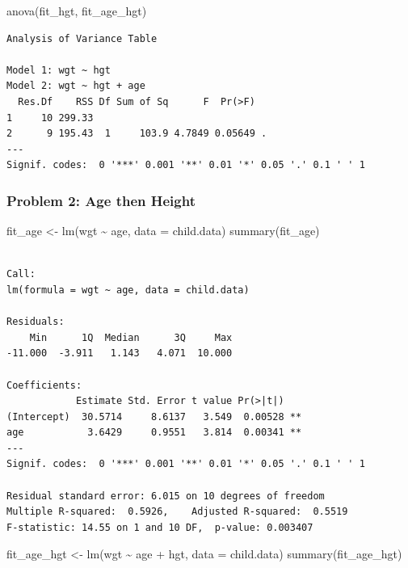 \documentclass[
  letterpaper,
]{scrbook}
\newenvironment{Shaded}{\begin{snugshade}}{\end{snugshade}}
\newcommand{\AttributeTok}[1]{\textcolor[rgb]{0.40,0.45,0.13}{#1}}
\newcommand{\FunctionTok}[1]{\textcolor[rgb]{0.28,0.35,0.67}{#1}}
\newcommand{\NormalTok}[1]{\textcolor[rgb]{0.00,0.23,0.31}{#1}}
\newcommand{\OtherTok}[1]{\textcolor[rgb]{0.00,0.23,0.31}{#1}}
\newcommand{\SpecialCharTok}[1]{\textcolor[rgb]{0.37,0.37,0.37}{#1}}
\begin{document}
\begin{Shaded}
\begin{Highlighting}[]
\FunctionTok{anova}\NormalTok{(fit\_hgt, fit\_age\_hgt)}
\end{Highlighting}
\end{Shaded}

\begin{verbatim}
Analysis of Variance Table

Model 1: wgt ~ hgt
Model 2: wgt ~ hgt + age
  Res.Df    RSS Df Sum of Sq      F  Pr(>F)  
1     10 299.33                              
2      9 195.43  1     103.9 4.7849 0.05649 .
---
Signif. codes:  0 '***' 0.001 '**' 0.01 '*' 0.05 '.' 0.1 ' ' 1
\end{verbatim}

\subsubsection{Problem 2: Age then
Height}\label{problem-2-age-then-height}

\begin{Shaded}
\begin{Highlighting}[]
\NormalTok{fit\_age }\OtherTok{\textless{}{-}} \FunctionTok{lm}\NormalTok{(wgt }\SpecialCharTok{\textasciitilde{}}\NormalTok{ age, }\AttributeTok{data =}\NormalTok{ child.data)}
\FunctionTok{summary}\NormalTok{(fit\_age)}
\end{Highlighting}
\end{Shaded}

\begin{verbatim}

Call:
lm(formula = wgt ~ age, data = child.data)

Residuals:
    Min      1Q  Median      3Q     Max 
-11.000  -3.911   1.143   4.071  10.000 

Coefficients:
            Estimate Std. Error t value Pr(>|t|)   
(Intercept)  30.5714     8.6137   3.549  0.00528 **
age           3.6429     0.9551   3.814  0.00341 **
---
Signif. codes:  0 '***' 0.001 '**' 0.01 '*' 0.05 '.' 0.1 ' ' 1

Residual standard error: 6.015 on 10 degrees of freedom
Multiple R-squared:  0.5926,    Adjusted R-squared:  0.5519 
F-statistic: 14.55 on 1 and 10 DF,  p-value: 0.003407
\end{verbatim}

\begin{Shaded}
\begin{Highlighting}[]
\NormalTok{fit\_age\_hgt }\OtherTok{\textless{}{-}} \FunctionTok{lm}\NormalTok{(wgt }\SpecialCharTok{\textasciitilde{}}\NormalTok{ age }\SpecialCharTok{+}\NormalTok{ hgt, }\AttributeTok{data =}\NormalTok{ child.data)}
\FunctionTok{summary}\NormalTok{(fit\_age\_hgt)}
\end{Highlighting}
\end{Shaded}
\end{document}
